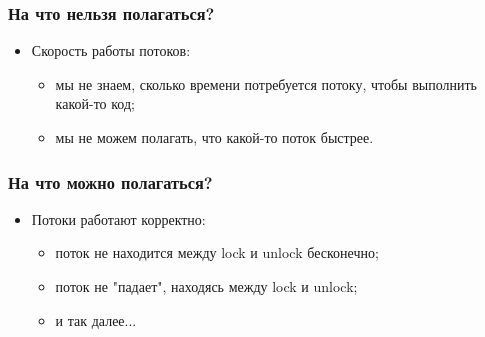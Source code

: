 \begin{frame}
\frametitle{На что нельзя полагаться?}
\begin{itemize}
    \item<1->Скорость работы потоков:
    \begin{itemize}
        \item<2->мы не знаем, сколько времени потребуется потоку, чтобы
             выполнить какой-то код;
        \item<3->мы не можем полагать, что какой-то поток быстрее.
    \end{itemize}
\end{itemize}
\end{frame}

\begin{frame}
\frametitle{На что можно полагаться?}
\begin{itemize}
    \item<1->Потоки работают корректно:
    \begin{itemize}
        \item<2->поток не находится между lock и unlock бесконечно;
        \item<3->поток не "падает", находясь между lock и unlock;
        \item<4->и так далее...
    \end{itemize}
\end{itemize}
\end{frame}
